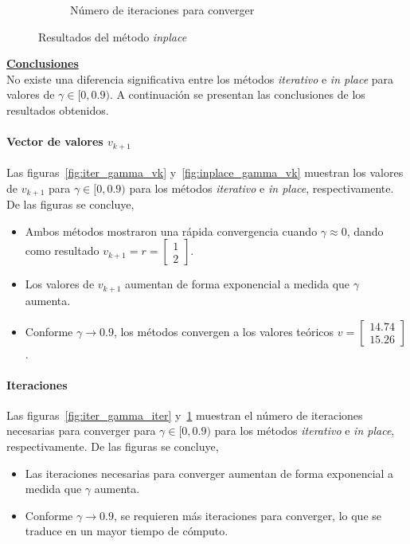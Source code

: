 \begin{figure}[H]
\begin{subfigure}[H]{0.45\textwidth}
        \caption{Número de iteraciones para converger}
        \label{fig:inplace_gamma_iter}
    \end{subfigure}
    \caption{Resultados del método \textit{inplace}}\label{fig:inplace_gamma}
\end{figure}

\indent\underline{\textbf{Conclusiones}}\\
No existe una diferencia significativa entre los métodos \textit{iterativo} e \textit{in place} para valores de $\gamma \in [0, 0.9)$.
A continuación se presentan las conclusiones de los resultados obtenidos.

\paragraph{Vector de valores $v_{k+1}$}
Las figuras~\ref{fig:iter_gamma_vk} y~\ref{fig:inplace_gamma_vk} muestran los valores de $v_{k+1}$ para $\gamma \in [0, 0.9)$ para los métodos \textit{iterativo} e \textit{in place}, respectivamente.
De las figuras se concluye,

\begin{itemize}
    \item Ambos métodos mostraron una rápida convergencia cuando $\gamma \approx 0$, dando como resultado $v_{k+1} = r = \begin{bmatrix} 1 \\ 2 \end{bmatrix}$.
    \item Los valores de $v_{k+1}$ aumentan de forma exponencial a medida que $\gamma$ aumenta.
    \item Conforme $\gamma \rightarrow 0.9$, los métodos convergen a los valores teóricos $v = \begin{bmatrix} 14.74 \\ 15.26 \end{bmatrix}$.
\end{itemize}

\paragraph{Iteraciones}
Las figuras~\ref{fig:iter_gamma_iter} y~\ref{fig:inplace_gamma_iter} muestran el número de iteraciones necesarias para converger para $\gamma \in [0, 0.9)$ para los métodos \textit{iterativo} e \textit{in place}, respectivamente.
De las figuras se concluye,

\begin{itemize}
    \item Las iteraciones necesarias para converger aumentan de forma exponencial a medida que $\gamma$ aumenta.
    \item Conforme $\gamma \rightarrow 0.9$, se requieren más iteraciones para converger, lo que se traduce en un mayor tiempo de cómputo.
\end{itemize}

